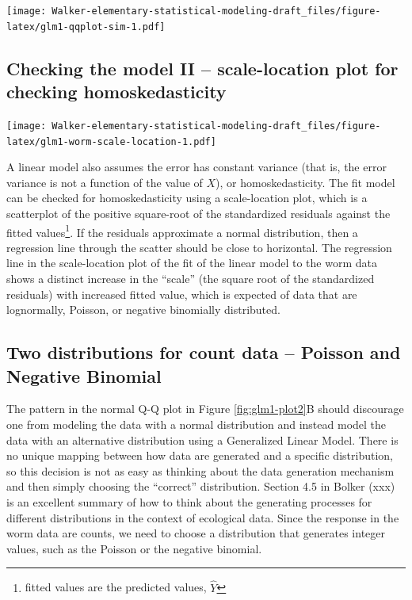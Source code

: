 \documentclass[]{book}
\let\rmarkdownfootnote\footnote%
\def\footnote{\protect\rmarkdownfootnote}
\begin{document}
\texttt{[image: Walker-elementary-statistical-modeling-draft\_files/figure-latex/glm1-qqplot-sim-1.pdf]}

\subsection{Checking the model II -- scale-location plot for checking
homoskedasticity}\label{checking-the-model-ii-scale-location-plot-for-checking-homoskedasticity}

\texttt{[image: Walker-elementary-statistical-modeling-draft\_files/figure-latex/glm1-worm-scale-location-1.pdf]}

A linear model also assumes the error has constant variance (that is,
the error variance is not a function of the value of \(X\)), or
homoskedasticity. The fit model can be checked for homoskedasticity
using a scale-location plot, which is a scatterplot of the positive
square-root of the standardized residuals against the fitted
values\footnote{fitted values are the predicted values, \(\hat{Y}\)}. If
the residuals approximate a normal distribution, then a regression line
through the scatter should be close to horizontal. The regression line
in the scale-location plot of the fit of the linear model to the worm
data shows a distinct increase in the ``scale'' (the square root of the
standardized residuals) with increased fitted value, which is expected
of data that are lognormally, Poisson, or negative binomially
distributed.

\subsection{Two distributions for count data -- Poisson and Negative
Binomial}\label{two-distributions-for-count-data-poisson-and-negative-binomial}

The pattern in the normal Q-Q plot in Figure \ref{fig:glm1-plot2}B
should discourage one from modeling the data with a normal distribution
and instead model the data with an alternative distribution using a
Generalized Linear Model. There is no unique mapping between how data
are generated and a specific distribution, so this decision is not as
easy as thinking about the data generation mechanism and then simply
choosing the ``correct'' distribution. Section 4.5 in Bolker (xxx) is an
excellent summary of how to think about the generating processes for
different distributions in the context of ecological data. Since the
response in the worm data are counts, we need to choose a distribution
that generates integer values, such as the Poisson or the negative
binomial.
\end{document}
